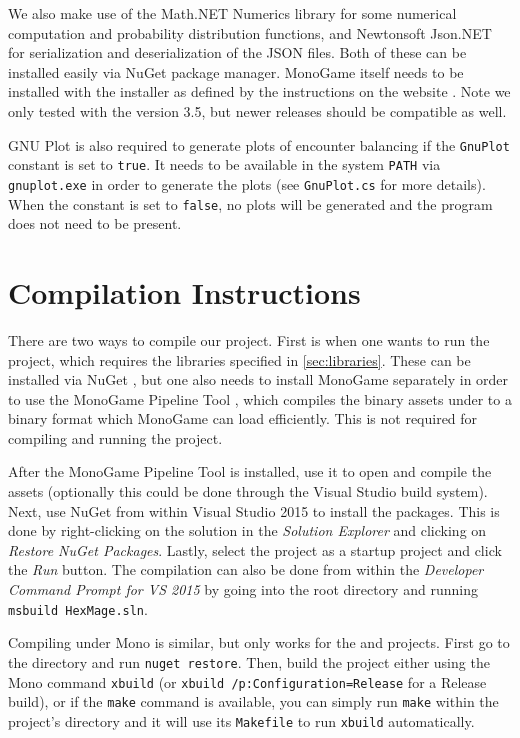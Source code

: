We also make use of the Math.NET Numerics \citep{math-dotnet} library for some numerical computation and probability distribution functions, and Newtonsoft Json.NET \citep{json-dotnet} for serialization and deserialization of the JSON files. Both of these can be installed easily via NuGet \citep{nuget} package manager. MonoGame itself needs to be installed with the installer as defined by the instructions on the website \citep{monogame}. Note we only tested with the version 3.5, but newer releases should be compatible as well.

GNU Plot \citep{gnuplot} is also required to generate plots of encounter balancing if the \verb|GnuPlot| constant is set to \verb|true|. It needs to be available in the system \verb|PATH| via \verb|gnuplot.exe| in order to generate the plots (see \verb|GnuPlot.cs| for more details). When the constant is set to \verb|false|, no plots will be generated and the program does not need to be present.

\section{Compilation Instructions}
\label{sec:compilation}

There are two ways to compile our project. First is when one wants to run the  project, which requires the libraries specified in \autoref{sec:libraries}. These can be installed via NuGet \citep{nuget}, but one also needs to install MonoGame separately in order to use the MonoGame Pipeline Tool \citep{monogame-pipeline}, which compiles the binary assets under  to a binary format which MonoGame can load efficiently. This is not required for compiling and running the  project.

After the MonoGame Pipeline Tool is installed, use it to open  and compile the assets (optionally this could be done through the Visual Studio build system). Next, use NuGet from within Visual Studio 2015 to install the packages. This is done by right-clicking on the  solution in the \emph{Solution Explorer} and clicking on \emph{Restore NuGet Packages}. Lastly, select the  project as a startup project and click the \emph{Run} button. The compilation can also be done from within the \emph{Developer Command Prompt for VS 2015} by going into the root  directory and running \verb|msbuild HexMage.sln|.

Compiling under Mono is similar, but only works for the  and  projects. First go to the  directory and run \verb|nuget restore|. Then, build the project either using the Mono command \verb|xbuild| (or \verb|xbuild /p:Configuration=Release| for a Release build), or if the \verb|make| command is available, you can simply run \verb|make| within the project's directory and it will use its \verb|Makefile| to run \verb|xbuild| automatically.

